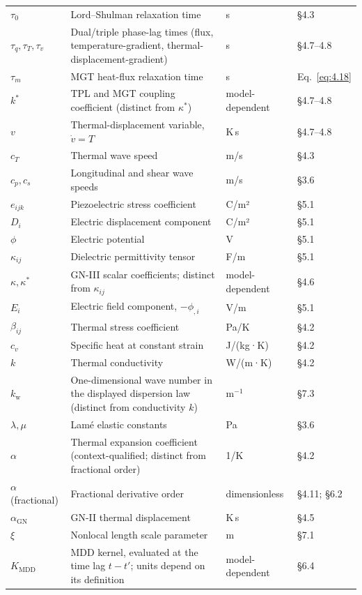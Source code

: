 \begin{table}[htbp]
\begin{tabularx}{\textwidth}{@{}p{1.8cm}X p{2.2cm}p{2.1cm}@{}}
$\tau_0$ & Lord--Shulman relaxation time & s & §4.3 \\
$\tau_q, \tau_T, \tau_v$ & Dual/triple phase-lag times (flux, temperature-gradient, thermal-displacement-gradient) & s & §4.7--4.8 \\
$\tau_m$ & MGT heat-flux relaxation time & s & Eq.~\eqref{eq:4.18} \\
$k^*$ & TPL and MGT coupling coefficient (distinct from $\kappa^*$) & model-dependent & §4.7--4.8 \\
$v$ & Thermal-displacement variable, $\dot v = T$ & K\,s & §4.7--4.8 \\
$c_T$ & Thermal wave speed & m/s & §4.3 \\
$c_p, c_s$ & Longitudinal and shear wave speeds & m/s & §3.6 \\
$e_{ijk}$ & Piezoelectric stress coefficient & C/m² & §5.1 \\
$D_i$ & Electric displacement component & C/m² & §5.1 \\
$\phi$ & Electric potential & V & §5.1 \\
$\kappa_{ij}$ & Dielectric permittivity tensor & F/m & §5.1 \\
$\kappa, \kappa^*$ & GN-III scalar coefficients; distinct from $\kappa_{ij}$ & model-dependent & §4.6 \\
$E_i$ & Electric field component, $-\phi_{,i}$ & V/m & §5.1 \\
$\beta_{ij}$ & Thermal stress coefficient & Pa/K & §4.2 \\
$c_v$ & Specific heat at constant strain & J/(kg·K) & §4.2 \\
$k$ & Thermal conductivity & W/(m·K) & §4.2 \\
$k_{\mathrm w}$ & One-dimensional wave number in the displayed dispersion law (distinct from conductivity $k$) & m$^{-1}$ & §7.3 \\
$\lambda, \mu$ & Lamé elastic constants & Pa & §3.6 \\
$\alpha$ & Thermal expansion coefficient (context-qualified; distinct from fractional order) & 1/K & §4.2 \\
$\alpha$ (fractional) & Fractional derivative order & dimensionless & §4.11; §6.2 \\
$\alpha_{\mathrm{GN}}$ & GN-II thermal displacement & K\,s & §4.5 \\
$\xi$ & Nonlocal length scale parameter & m & §7.1 \\
$K_{\mathrm{MDD}}$ & MDD kernel, evaluated at the time lag $t-t'$; units depend on its definition & model-dependent & §6.4 \\
\bottomrule
\end{tabularx}
\end{table}
